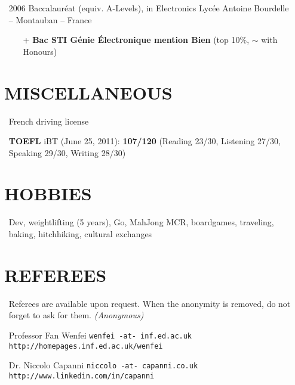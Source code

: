 \documentclass{res}
\begin{document}
\begin{resume}
\begin{itemize}
        \item[] 2006 \tabto{2cm} Baccalaur\'eat (equiv. A-Levels), in Electronics \hfill Lyc\'ee Antoine Bourdelle -- Montauban -- France
        \begin{itemize}
            \item[+] \textbf{Bac STI G\'enie \'Electronique mention Bien} (top 10\%, $\sim$ with Honours)
        \end{itemize}
    \end{itemize}

\section{\faMagic~MISCELLANEOUS}
    \begin{itemize}
        \item[] French driving license
        \item[] \textbf{TOEFL} iBT (June 25, 2011): \textbf{107/120} (Reading 23/30, Listening 27/30, Speaking 29/30, Writing 28/30)
    \end{itemize}
 
\section{\faGamepad~HOBBIES}
    \begin{itemize}
        \item[] Dev, weightlifting (5 years), Go, MahJong MCR, boardgames, traveling, baking, hitchhiking, cultural exchanges
    \end{itemize}

\section{\faUserCheck~REFEREES}
    \ifisanon
        \begin{itemize}
            \item[] Referees are available upon request. When the anonymity is removed, do not forget to ask for them. \textit{(Anonymous)}
        \end{itemize}
    \else
        \begin{itemize}
            \item[] Professor Fan Wenfei \tabto{5cm} \texttt{wenfei -at- inf.ed.ac.uk} \hfill \texttt{http://homepages.inf.ed.ac.uk/wenfei}
            \item[] Dr. Niccolo Capanni \tabto{5cm} \texttt{niccolo -at- capanni.co.uk} \hfill \texttt{http://www.linkedin.com/in/capanni}
        \end{itemize}
    \fi

\end{resume} 
\end{document}
